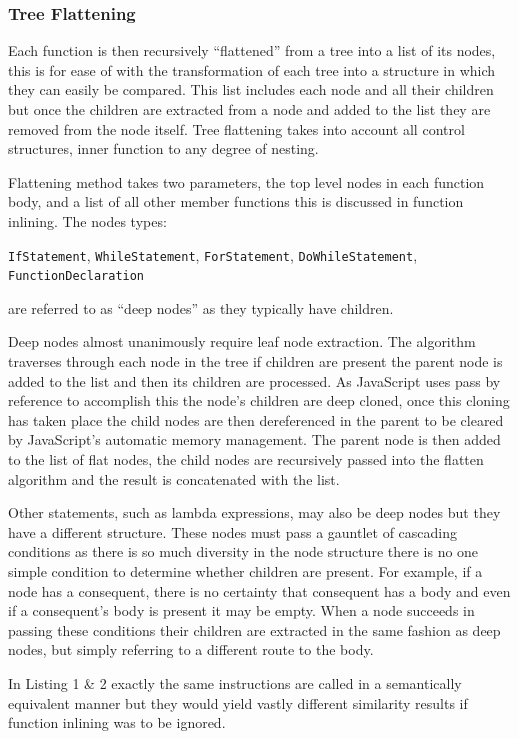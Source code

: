 \documentclass[jou,apacite]{apa6}
\begin{document}
\subsubsection{Tree Flattening}
Each function is then recursively “flattened” from a tree into a list of its nodes, this is for ease of with the transformation of each tree into a structure in which they can easily be compared. This list includes each node and all their children but once the children are extracted from a node and added to the list they are removed from the node itself. Tree flattening takes into account all control structures, inner function to any degree of nesting. 

Flattening method takes two parameters, the top level nodes in each function body, and a list of all other member functions this is discussed in function inlining. The nodes types:

\texttt{IfStatement}, \texttt{WhileStatement}, \texttt{ForStatement}, \texttt{DoWhileStatement}, \texttt{FunctionDeclaration}

are referred to as “deep nodes” as they typically have children.

Deep nodes almost unanimously require leaf node extraction. The algorithm traverses through each node in the tree if children are present the parent node is added to the list and then its children are processed. As JavaScript uses pass by reference to accomplish this the node’s children are deep cloned, once this cloning has taken place the child nodes are then dereferenced in the parent to be cleared by JavaScript’s automatic memory management. The parent node is then added to the list of flat nodes, the child nodes are recursively passed into the flatten algorithm and the result is concatenated with the list. 

Other statements, such as lambda expressions, may also be deep nodes but they have a different structure. These nodes must pass a gauntlet of cascading conditions as there is so much diversity in the node structure there is no one simple condition to determine whether children are present. For example, if a node has a consequent, there is no certainty that consequent has a body and even if a consequent's body is present it may be empty. When a node succeeds in passing these conditions their children are extracted in the same fashion as deep nodes, but simply referring to a different route to the body. 

In Listing 1 \& 2 exactly the same instructions are called in a semantically equivalent manner but they would yield vastly different similarity results if function inlining was to be ignored. 
\end{document}

